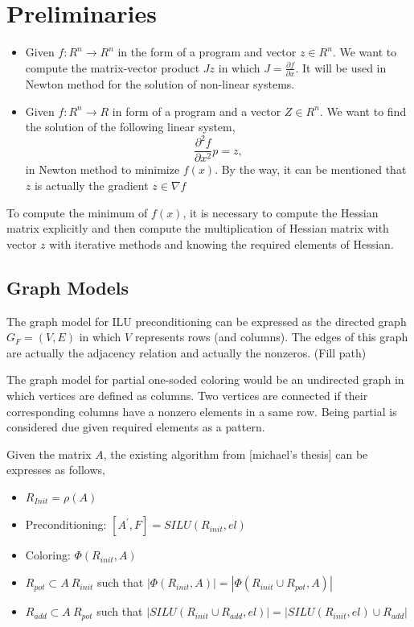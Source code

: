 \documentclass[12pt, oneside]{book}
\begin{document}
\chapter{Preliminaries}
\begin{itemize}
\item Given $f:R^n\rightarrow R^n$ in the form of a program
and vector $z\in R^n$. We want to compute the matrix-vector product
$Jz$ in which $J=\frac{\partial f}{\partial x}$.
It will be used in Newton method for the solution of
non-linear systems.
\item Given $f:R^n\rightarrow R$ in form of a program and a 
vector $Z\in R^n$. We want to find the solution of
the following linear system,
$$
\frac{\partial^2 f}{\partial x^2}p =z,
$$
in Newton method to minimize $f(x)$. By the way,
it can be mentioned that $z$ is actually the gradient 
$z \in\nabla f$
\end{itemize}
To compute the minimum of $f(x)$, it is necessary to
compute the Hessian matrix explicitly and then compute the 
multiplication of Hessian matrix with vector $z$ with
iterative methods and knowing the required elements of Hessian.
\section{Graph Models}
The graph model for ILU preconditioning can be expressed as the directed graph $G_F=(V,E)$
in which $V$ represents rows (and columns). The edges of this graph are actually the adjacency relation
and actually the nonzeros. (Fill path)

The graph model for partial one-soded coloring would be an undirected graph in which
vertices are defined as columns. Two vertices are connected if their corresponding 
columns have a nonzero elements in a same row. Being partial is considered due given
required elements as a pattern. 

Given the matrix $A$, the existing algorithm from [michael's thesis] can be expresses as follows,
\begin{itemize}
\item $R_{Init}=\rho(A)$
\item Preconditioning: $[A^{'},F] = SILU(R_{init},el)$
\item Coloring: $\Phi(R_{init},A)$
\item $R_{pot}\subset A\ R_{init}$ such that $|\Phi(R_{init},A)|=|\Phi(R_{init}\cup R_{pot},A)|$
\item $R_{add}\subset A\ R_{pot}$ such that $|SILU(R_{init}\cup R_{add},el)|=|SILU(R_{init},el) \cup R_{add}|$
\end{itemize}
\end{document}
